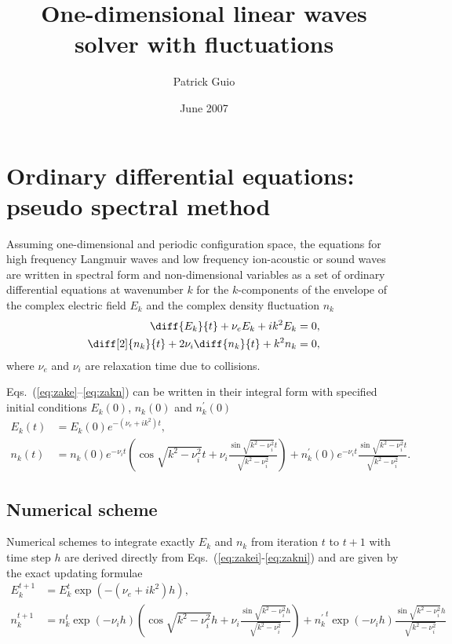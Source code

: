 \documentclass[10pt,a4paper]{article}
\title{One-dimensional linear waves solver with fluctuations}
\author{Patrick Guio}
\date{June 2007}
\newcommand{\eqs}[1]{Eqs.~(#1)}
\def\knui{\sqrt{k^2{-}\nu_i^2}}
\begin{document}
\maketitle

\section{Ordinary differential equations: pseudo spectral method}

Assuming one-dimensional and periodic configuration space, the equations for high frequency 
Langmuir waves and low frequency ion-acoustic or sound waves are written in spectral form and
non-dimensional variables as a set of ordinary differential equations at wavenumber $k$ 
for the $k$-components of the envelope of the complex electric field $E_k$ and the complex density
fluctuation $n_k$
\begin{align}
\diff{E_k}{t} + \nu_eE_k + ik^2E_k &= 0, \label{eq:zake}\\
\diff[2]{n_k}{t} + 2\nu_i\diff{n_k}{t} + k^2n_k &= 0,  \label{eq:zakn}
\end{align}
where $\nu_e$ and $\nu_i$ are relaxation time due to collisions.

\eqs{\ref{eq:zake}--\ref{eq:zakn}} can be written in their integral form with specified initial
conditions $E_k(0)$, $n_k(0)$ and $n_k^\prime(0)$
\begin{align}
E_k(t) &= E_k(0) e^{-(\nu_e{+}ik^2)t}, \label{eq:zakei}\\
n_k(t) &= n_k(0) e^{-\nu_it}\left(\cos\knui t+\nu_i\frac{\sin\knui t}{\knui}\right)+
          n_k^\prime(0) e^{-\nu_it}\frac{\sin\knui t}{\knui}. \label{eq:zakni}
\end{align}

\subsection{Numerical scheme}

Numerical schemes to integrate exactly $E_k$ and $n_k$ from iteration $t$ to $t+1$ with
time step $h$ are derived directly from \eqs{\ref{eq:zakei}-\ref{eq:zakni}} and are given by
the exact updating formulae
\begin{align}
E_k^{t+1} &= E_k^t\exp\left(-(\nu_e+ik^2)h\right), \label{eq:Eknum}\\
n_k^{t+1} &= n_k^t\exp(-\nu_ih)\left(\cos\knui h+ \nu_i\frac{\sin\knui h}{\knui}\right)+
{n_k^\prime}^t\exp(-\nu_ih)\frac{\sin\knui h}{\knui} \label{eq:nknum}
\end{align}
\end{document}
